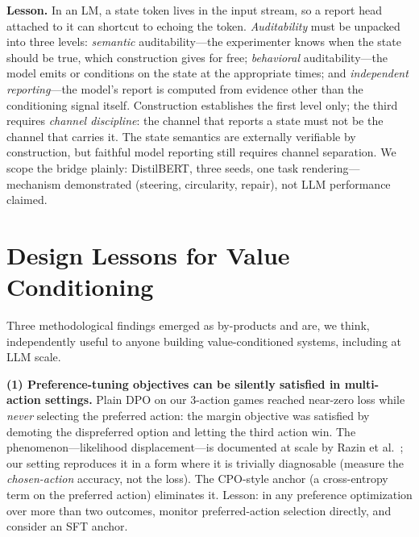 \documentclass[11pt]{article}
\begin{document}
\textbf{Lesson.} In an LM, a state token lives in the input stream, so a report head attached to it can shortcut to echoing the token. \emph{Auditability} must be unpacked into three levels: \emph{semantic} auditability---the experimenter knows when the state should be true, which construction gives for free; \emph{behavioral} auditability---the model emits or conditions on the state at the appropriate times; and \emph{independent reporting}---the model's report is computed from evidence other than the conditioning signal itself. Construction establishes the first level only; the third requires \emph{channel discipline}: the channel that reports a state must not be the channel that carries it. The state semantics are externally verifiable by construction, but faithful model reporting still requires channel separation. We scope the bridge plainly: DistilBERT, three seeds, one task rendering---mechanism demonstrated (steering, circularity, repair), not LLM performance claimed.

\section{Design Lessons for Value Conditioning}
\label{sec:lessons}

Three methodological findings emerged as by-products and are, we think, independently useful to
anyone building value-conditioned systems, including at LLM scale.

\textbf{(1) Preference-tuning objectives can be silently satisfied in multi-action settings.}
Plain DPO on our 3-action games reached near-zero loss while \emph{never} selecting the preferred
action: the margin objective was satisfied by demoting the dispreferred option and letting the
third action win. The phenomenon---likelihood displacement---is documented at scale
by Razin et al.~\cite{razin2024unintentional}; our setting reproduces it in a form where it is
trivially diagnosable (measure the \emph{chosen-action} accuracy, not the loss). The CPO-style
anchor (a cross-entropy term on the preferred action) eliminates it. Lesson: in any preference
optimization over more than two outcomes, monitor preferred-action selection directly, and
consider an SFT anchor.
\end{document}
